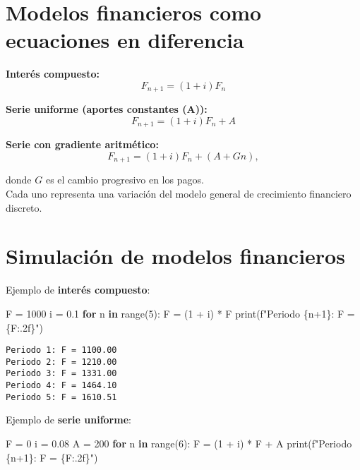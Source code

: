 \documentclass[
  letterpaper,
  DIV=11,
  numbers=noendperiod]{scrreprt}
\newenvironment{Shaded}{\begin{snugshade}}{\end{snugshade}}
\newcommand{\BuiltInTok}[1]{\textcolor[rgb]{0.00,0.23,0.31}{#1}}
\newcommand{\ControlFlowTok}[1]{\textcolor[rgb]{0.00,0.23,0.31}{\textbf{#1}}}
\newcommand{\DecValTok}[1]{\textcolor[rgb]{0.68,0.00,0.00}{#1}}
\newcommand{\FloatTok}[1]{\textcolor[rgb]{0.68,0.00,0.00}{#1}}
\newcommand{\KeywordTok}[1]{\textcolor[rgb]{0.00,0.23,0.31}{\textbf{#1}}}
\newcommand{\NormalTok}[1]{\textcolor[rgb]{0.00,0.23,0.31}{#1}}
\newcommand{\OperatorTok}[1]{\textcolor[rgb]{0.37,0.37,0.37}{#1}}
\newcommand{\SpecialCharTok}[1]{\textcolor[rgb]{0.37,0.37,0.37}{#1}}
\newcommand{\SpecialStringTok}[1]{\textcolor[rgb]{0.13,0.47,0.30}{#1}}
\begin{document}
\section{Modelos financieros como ecuaciones en
diferencia}\label{modelos-financieros-como-ecuaciones-en-diferencia}

\textbf{Interés compuesto:} \[
F_{n+1} = (1+i)F_n
\]

\textbf{Serie uniforme (aportes constantes (A)):} \[
F_{n+1} = (1+i)F_n + A
\]

\textbf{Serie con gradiente aritmético:} \[
F_{n+1} = (1+i)F_n + (A + Gn),
\]

donde \(G\) es el cambio progresivo en los pagos.\\
Cada uno representa una variación del modelo general de crecimiento
financiero discreto.

\section{Simulación de modelos
financieros}\label{simulaciuxf3n-de-modelos-financieros}

Ejemplo de \textbf{interés compuesto}:

\begin{Shaded}
\begin{Highlighting}[]
\NormalTok{F }\OperatorTok{=} \DecValTok{1000}
\NormalTok{i }\OperatorTok{=} \FloatTok{0.1}
\ControlFlowTok{for}\NormalTok{ n }\KeywordTok{in} \BuiltInTok{range}\NormalTok{(}\DecValTok{5}\NormalTok{):}
\NormalTok{    F }\OperatorTok{=}\NormalTok{ (}\DecValTok{1} \OperatorTok{+}\NormalTok{ i) }\OperatorTok{*}\NormalTok{ F}
    \BuiltInTok{print}\NormalTok{(}\SpecialStringTok{f"Periodo }\SpecialCharTok{\{}\NormalTok{n}\OperatorTok{+}\DecValTok{1}\SpecialCharTok{\}}\SpecialStringTok{: F = }\SpecialCharTok{\{}\NormalTok{F}\SpecialCharTok{:.2f\}}\SpecialStringTok{"}\NormalTok{)}
\end{Highlighting}
\end{Shaded}

\begin{verbatim}
Periodo 1: F = 1100.00
Periodo 2: F = 1210.00
Periodo 3: F = 1331.00
Periodo 4: F = 1464.10
Periodo 5: F = 1610.51
\end{verbatim}

Ejemplo de \textbf{serie uniforme}:

\begin{Shaded}
\begin{Highlighting}[]
\NormalTok{F }\OperatorTok{=} \DecValTok{0}
\NormalTok{i }\OperatorTok{=} \FloatTok{0.08}
\NormalTok{A }\OperatorTok{=} \DecValTok{200}
\ControlFlowTok{for}\NormalTok{ n }\KeywordTok{in} \BuiltInTok{range}\NormalTok{(}\DecValTok{6}\NormalTok{):}
\NormalTok{    F }\OperatorTok{=}\NormalTok{ (}\DecValTok{1} \OperatorTok{+}\NormalTok{ i) }\OperatorTok{*}\NormalTok{ F }\OperatorTok{+}\NormalTok{ A}
    \BuiltInTok{print}\NormalTok{(}\SpecialStringTok{f"Periodo }\SpecialCharTok{\{}\NormalTok{n}\OperatorTok{+}\DecValTok{1}\SpecialCharTok{\}}\SpecialStringTok{: F = }\SpecialCharTok{\{}\NormalTok{F}\SpecialCharTok{:.2f\}}\SpecialStringTok{"}\NormalTok{)}
\end{Highlighting}
\end{Shaded}
\end{document}
